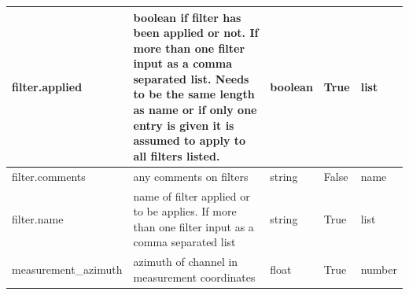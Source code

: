 \documentclass{article}
\begin{document}
\begin{table}[h!]
\begin{tabular}{|l|p{2.75in}|l|l|p{.95in}|}
	filter.applied & boolean if filter has been applied or not. If more than one filter input as a comma separated list.  Needs to be the same length as name or if only one entry is given it is assumed to apply to all filters listed. & boolean & True & list \\ \hline
	filter.comments & any comments on filters & string & False & name \\ \hline
	filter.name & name of filter applied or to be applies. If more than one filter input as a comma separated list & string & True & list \\ \hline
	measurement\_azimuth & azimuth of channel in measurement coordinates & float & True & number \\ \hline
    
    \end{tabular}
    \label{tab:electric01}
\end{table}    
\end{document}
